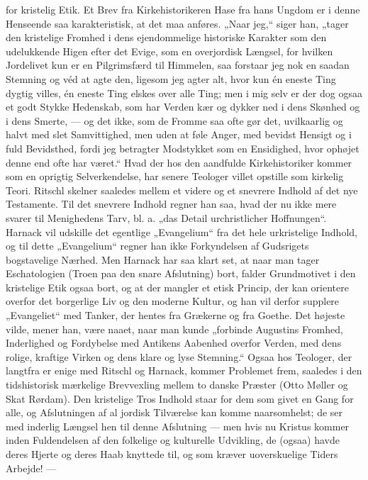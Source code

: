 \documentclass[12pt,a4paper,openany]{book}
\newcommand{\opage}[1]{\marginnote{\footnotesize\textit{[#1]}}}
\begin{document}
for kristelig Etik. Et Brev fra Kirkehistorikeren Hase fra hans
Ungdom er i denne Henseende saa karakteristisk, at det maa anføres.
„Naar jeg,“ siger han, „tager den kristelige Fromhed i dens
ejendommelige historiske Karakter som den udelukkende Higen efter
det Evige, som en overjordisk Længsel, for hvilken Jordelivet kun er
en Pilgrimsfærd til Himmelen, saa forstaar jeg nok en saadan Stemning
og véd at agte den, ligesom jeg agter alt, hvor kun én eneste
Ting dygtig villes, én eneste Ting elskes over alle Ting; men i mig
selv er der dog ogsaa et godt Stykke Hedenskab, som har Verden
kær og dykker ned i dens Skønhed og i dens Smerte, --- og det ikke,
som de Fromme saa ofte gør det, uvilkaarlig og halvt med slet Samvittighed,
men uden at føle Anger, med bevidst Hensigt og i fuld
Bevidsthed, fordi jeg betragter Modstykket som en Ensidighed, hvor
ophøjet denne end ofte har været.“ Hvad der hos den aandfulde Kirkehistoriker
kommer som en oprigtig Selverkendelse, har senere Teologer
villet opstille som kirkelig Teori. Ritschl skelner saaledes mellem
et videre og et snevrere Indhold af det nye Testamente. Til det
snevrere Indhold regner han saa, hvad der nu ikke mere svarer til
Menighedens Tarv, bl. a. „das Detail urchristlicher Hoffnungen“.
Harnack vil udskille det egentlige „Evangelium“ fra det hele urkristelige
Indhold, og til dette „Evangelium“ regner han ikke Forkyndelsen
af Gudsrigets bogstavelige Nærhed. Men Harnack har saa
klart set, at naar man tager Eschatologien (Troen paa den snare Afslutning)
bort, falder Grundmotivet i den kristelige Etik ogsaa bort,
og at der mangler et etisk Princip, der kan orientere overfor det
borgerlige Liv og den moderne Kultur, og han vil derfor supplere
„Evangeliet“ med Tanker, der hentes fra Grækerne og fra Goethe.
Det højeste vilde, mener han, være naaet, naar man kunde „forbinde
\opage{146}Augustins Fromhed, Inderlighed og Fordybelse med Antikens Aabenhed
overfor Verden, med dens rolige, kraftige Virken og dens klare
og lyse Stemning.“ Ogsaa hos Teologer, der langtfra er enige med
Ritschl og Harnack, kommer Problemet frem, saaledes i den tidshistorisk
mærkelige Brevvexling mellem to danske Præster (Otto Møller
og Skat Rørdam). Den kristelige Tros Indhold staar for dem
som givet en Gang for alle, og Afslutningen af al jordisk Tilværelse
kan komme naarsomhelst; de ser med inderlig Længsel hen til denne
Afslutning --- men hvis nu Kristus kommer inden Fuldendelsen af
den folkelige og kulturelle Udvikling, de (ogsaa) havde deres Hjerte
og deres Haab knyttede til, og som kræver uoverskuelige Tiders Arbejde!
---
\end{document}
